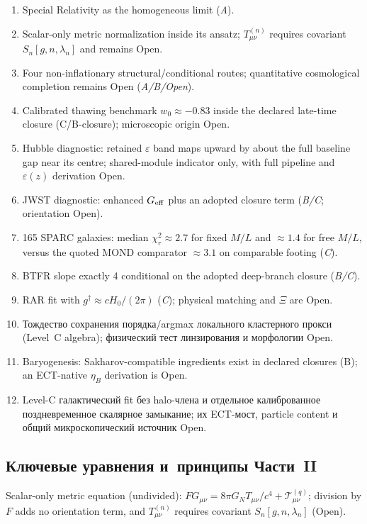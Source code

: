 \documentclass[11pt,a4paper]{article}
\begin{document}
\begin{enumerate}
\item Special Relativity as the homogeneous limit (\emph{A}).
\item Scalar-only metric normalization inside its ansatz; $T^{(n)}_{\mu\nu}$ requires covariant $S_n[g,n,\lambda_n]$ and remains Open.
\item Four non-inflationary structural/conditional routes; quantitative cosmological completion remains Open (\emph{A/B/Open}).
\item Calibrated thawing benchmark $w_0\approx-0.83$ inside the declared late-time closure (C/B-closure); microscopic origin Open.
\item Hubble diagnostic: retained $\varepsilon$ band maps upward by about the full baseline gap near its centre; shared-module indicator only, with full pipeline and $\varepsilon(z)$ derivation Open.
\item JWST diagnostic: enhanced $G_{\rm eff}$ plus an adopted closure term (\emph{B/C}; orientation Open).
\item 165 SPARC galaxies: median $\chi_r^2\approx2.7$ for fixed $M/L$ and $\approx1.4$ for free $M/L$, versus the quoted MOND comparator $\approx3.1$ on comparable footing (\emph{C}).
\item BTFR slope exactly 4 conditional on the adopted deep-branch closure (\emph{B/C}).
\item RAR fit with $g^\dagger \approx cH_0/(2\pi)$ (\emph{C}); physical matching and $\Xi$ are Open.
\item Тождество сохранения порядка/argmax локального кластерного прокси (Level~C algebra); физический тест линзирования и морфологии Open.
\item Baryogenesis: Sakharov-compatible ingredients exist in declared closures (B); an ECT-native $\eta_B$ derivation is Open.
\item Level-C галактический fit без halo-члена и отдельное калиброванное поздневременное скалярное замыкание; их ECT-мост, particle content и общий микроскопический источник Open.
\end{enumerate}

\subsection{Ключевые уравнения и~принципы Части~II}

Scalar-only metric equation (undivided): $F G_{\mu\nu}=8\pi G_N T_{\mu\nu}/c^4+\mathcal T^{(q)}_{\mu\nu}$; division by $F$ adds no orientation term, and $T^{(n)}_{\mu\nu}$ requires covariant $S_n[g,n,\lambda_n]$ (Open).
\end{document}
